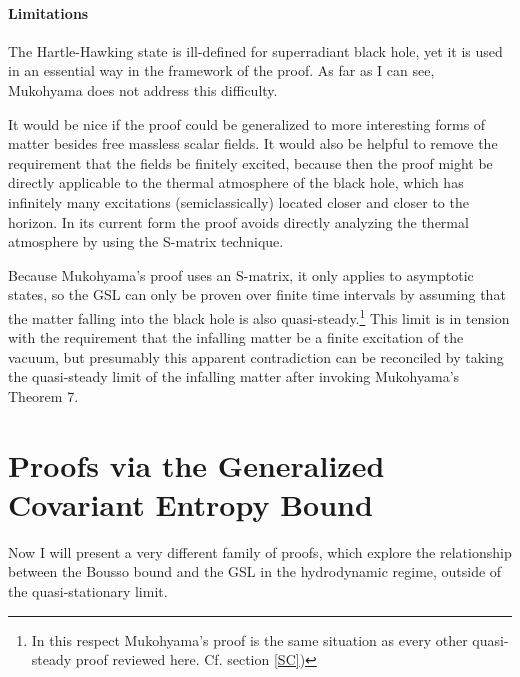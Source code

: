\documentclass[12pt]{article}
\begin{document}
\paragraph{Limitations}

The Hartle-Hawking state is ill-defined for superradiant black hole, yet it is used in an essential way in the framework of the proof.  As far as I can see, Mukohyama does not address this difficulty.

It would be nice if the proof could be generalized to more interesting forms of matter besides free massless scalar fields.  It would also be helpful to remove the requirement that the fields be finitely excited, because then the proof might be directly applicable to the thermal atmosphere of the black hole, which has infinitely many excitations (semiclassically) located closer and closer to the horizon.  In its current form the proof avoids directly analyzing the thermal atmosphere by using the S-matrix technique.

Because Mukohyama's proof uses an S-matrix, it only applies to asymptotic states, so the GSL can only be proven over finite time intervals by assuming that the matter falling into the black hole is also quasi-steady.\footnote{In this respect Mukohyama's proof is the same situation as every other quasi-steady proof reviewed here.  Cf. section \ref{SC})}  This limit is in tension with the requirement that the infalling matter be a finite excitation of the vacuum, but presumably this apparent contradiction can be reconciled by taking the quasi-steady limit of the infalling matter after invoking Mukohyama's Theorem 7.

\section{Proofs via the Generalized Covariant Entropy Bound}\label{BousB}

Now I will present a very different family of proofs, which explore the relationship between the Bousso bound and the GSL in the hydrodynamic regime, outside of the quasi-stationary limit.
\end{document}
